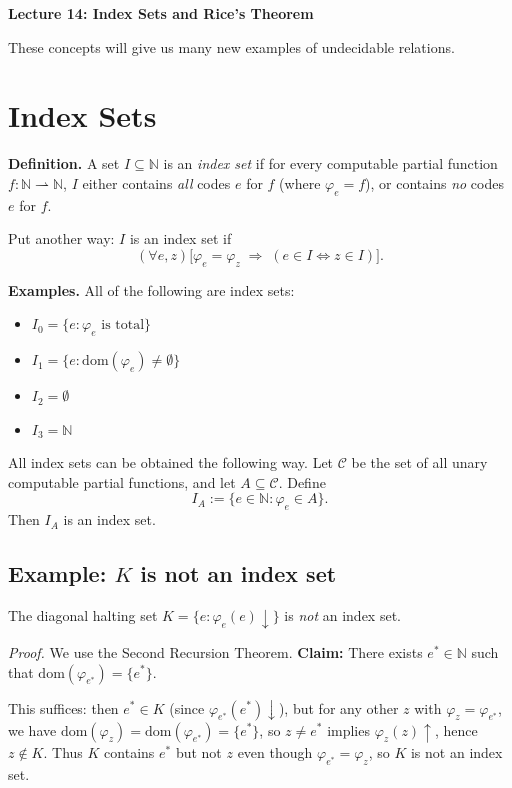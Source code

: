 \documentclass[11pt]{article}
\begin{document}
\newpage
{\LARGE\bfseries Lecture 14: Index Sets and Rice's Theorem}

These concepts will give us many new examples of undecidable relations.

\section{Index Sets}

\textbf{Definition.} A set $I \subseteq \mathbb{N}$ is an \emph{index set} if for every computable partial function $f\colon \mathbb{N} \rightharpoonup \mathbb{N}$, $I$ either contains \emph{all} codes $e$ for $f$ (where $\varphi_e = f$), or contains \emph{no} codes $e$ for $f$.

Put another way: $I$ is an index set if
\[
    (\forall e, z) \bigl[ \varphi_e = \varphi_z \;\Rightarrow\; (e \in I \Leftrightarrow z \in I) \bigr].
\]

\textbf{Examples.} All of the following are index sets:
\begin{itemize}[leftmargin=1.6em]
    \item $I_0 = \{ e : \varphi_e \text{ is total} \}$
    \item $I_1 = \{ e : \mathrm{dom}(\varphi_e) \neq \emptyset \}$
    \item $I_2 = \emptyset$
    \item $I_3 = \mathbb{N}$
\end{itemize}

All index sets can be obtained the following way. Let $\mathcal{C}$ be the set of all unary computable partial functions, and let $A \subseteq \mathcal{C}$. Define
\[
    I_A := \{ e \in \mathbb{N} : \varphi_e \in A \}.
\]
Then $I_A$ is an index set.

\subsection{Example: $K$ is not an index set}

The diagonal halting set $K = \{ e : \varphi_e(e)\downarrow \}$ is \emph{not} an index set.

\textit{Proof.} We use the Second Recursion Theorem. \textbf{Claim:} There exists $e^* \in \mathbb{N}$ such that $\mathrm{dom}(\varphi_{e^*}) = \{e^*\}$.

This suffices: then $e^* \in K$ (since $\varphi_{e^*}(e^*)\downarrow$), but for any other $z$ with $\varphi_z = \varphi_{e^*}$, we have $\mathrm{dom}(\varphi_z) = \mathrm{dom}(\varphi_{e^*}) = \{e^*\}$, so $z \neq e^*$ implies $\varphi_z(z)\uparrow$, hence $z \notin K$. Thus $K$ contains $e^*$ but not $z$ even though $\varphi_{e^*} = \varphi_z$, so $K$ is not an index set.
\end{document}

